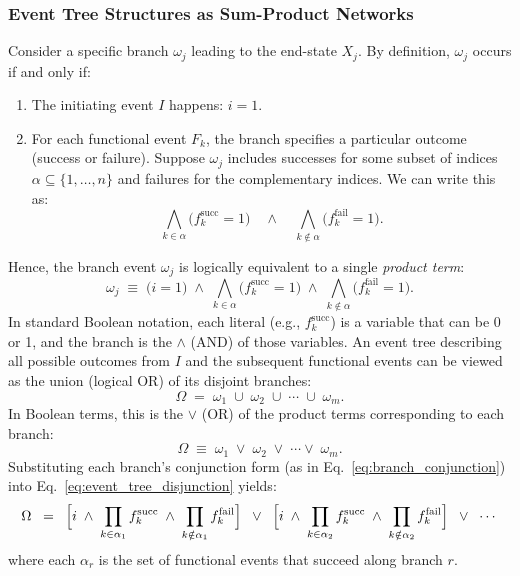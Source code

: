 \subsubsection{Event Tree Structures as Sum-Product Networks}
Consider a specific branch \(\omega_j\) leading to the end-state \(X_j\).  By definition, \(\omega_j\) occurs if and only if:
\begin{enumerate}
    \item The initiating event \(I\) happens: \(i=1\).
    \item For each functional event \(F_k\), the branch specifies a particular outcome (success or failure).  Suppose \(\omega_j\) includes successes for some subset of indices \(\alpha\subseteq \{1,\ldots,n\}\) and failures for the complementary indices.  We can write this as:
    \[
        \bigwedge_{k\in \alpha}  \bigl(f_{k}^{\text{succ}} = 1\bigr)
        \quad\wedge\quad
        \bigwedge_{k\notin \alpha} \bigl(f_{k}^{\text{fail}} = 1\bigr).
    \]
\end{enumerate}
Hence, the branch event \(\omega_j\) is logically equivalent to a single \emph{product term}:
\begin{equation}
\label{eq:branch_conjunction}
    \omega_j \;\equiv\; 
    \bigl(i=1\bigr)
    \;\wedge\;
    \bigwedge_{k\in \alpha} \bigl(f_k^{\text{succ}}=1\bigr)
    \;\wedge\;
    \bigwedge_{k\notin \alpha} \bigl(f_k^{\text{fail}}=1\bigr).
\end{equation}
In standard Boolean notation, each literal (e.g., \(f_k^{\text{succ}}\)) is a variable that can be 0 or 1, and the branch is the \(\land\) (AND) of those variables. An event tree describing all possible outcomes from \(I\) and the subsequent functional events can be viewed as the union (logical OR) of its disjoint branches:
\[
    \Omega \;=\; \omega_1 \;\cup\; \omega_2 \;\cup\;\cdots \;\cup\; \omega_m.
\]
In Boolean terms, this is the \(\lor\) (OR) of the product terms corresponding to each branch:
\begin{equation}
\label{eq:event_tree_disjunction}
    \Omega
    \;\equiv\;
    \omega_1
    \;\lor\;
    \omega_2
    \;\lor\;\cdots\lor\;
    \omega_m.
\end{equation}
Substituting each branch’s conjunction form (as in Eq.~\eqref{eq:branch_conjunction}) into Eq.~\eqref{eq:event_tree_disjunction} yields:
\[
    \Omega 
    \;\;=\;\;
    \Bigl[
        i \;\wedge\; \prod_{k\in \alpha_1} f_k^{\text{succ}} \;\wedge\; \prod_{k\notin \alpha_1} f_k^{\text{fail}}
    \Bigr]
    \;\;\lor\;\;
    \Bigl[
        i \;\wedge\; \prod_{k\in \alpha_2} f_k^{\text{succ}} \;\wedge\; \prod_{k\notin \alpha_2} f_k^{\text{fail}}
    \Bigr]
    \;\;\lor\;\;
    \cdots
\]
where each \(\alpha_r\) is the set of functional events that succeed along branch \(r\).

